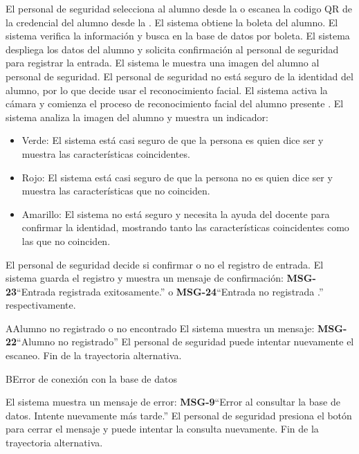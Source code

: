 \begin{UCtrayectoria}
\UCpaso[\UCactor] El personal de seguridad selecciona al alumno desde la  o escanea la codigo QR de la credencial del alumno desde la .
\UCpaso El sistema obtiene la boleta del alumno.
\UCpaso El sistema verifica la información y busca en la base de datos por boleta.  
\UCpaso El sistema despliega los datos del alumno y solicita confirmación al personal de seguridad para registrar la entrada.
\UCpaso El sistema le muestra una imagen del alumno al personal de seguridad.
\UCpaso[\UCactor] El personal de seguridad no está seguro de la identidad del alumno, por lo que decide usar el reconocimiento facial.  
\UCpaso El sistema activa la cámara y comienza el proceso de reconocimiento facial del alumno presente . 
\UCpaso El sistema analiza la imagen del alumno y muestra un indicador:
\begin{itemize}
	\item Verde: El sistema está casi seguro de que la persona es quien dice ser y muestra las características coincidentes.
	\item Rojo: El sistema está casi seguro de que la persona no es quien dice ser y muestra las características que no coinciden. 
	\item Amarillo: El sistema no está seguro y necesita la ayuda del docente para confirmar la identidad, mostrando tanto las características coincidentes como las que no coinciden. 
\end{itemize}
\UCpaso[\UCactor] El personal de seguridad decide si confirmar o no el registro de entrada.
\UCpaso El sistema guarda el registro y muestra un mensaje de confirmación: {\bf MSG-23}{``Entrada registrada exitosamente.''} o {\bf MSG-24}{``Entrada no registrada .''} respectivamente.
\end{UCtrayectoria}
\begin{UCtrayectoriaA}{A}{Alumno no registrado o no encontrado}
\UCpaso El sistema muestra un mensaje: {\bf MSG-22}{``Alumno no registrado''}
\UCpaso[\UCactor] El personal de seguridad puede intentar nuevamente el escaneo.
\UCpaso Fin de la trayectoria alternativa.
\end{UCtrayectoriaA}
\begin{UCtrayectoriaA}{B}{Error de conexión con la base de datos}

\UCpaso El sistema muestra un mensaje de error: {\bf MSG-9}{``Error al consultar la base de datos. Intente nuevamente más tarde.''}
\UCpaso[\UCactor] El personal de seguridad presiona el botón  para cerrar el mensaje y puede intentar la consulta nuevamente.
\UCpaso Fin de la trayectoria alternativa.
\end{UCtrayectoriaA}
